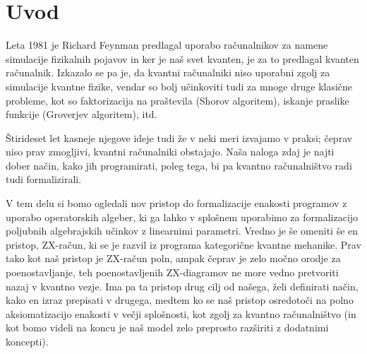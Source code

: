 \section{Uvod}

Leta 1981 je Richard Feynman predlagal uporabo računalnikov za namene simulacije fizikalnih pojavov\cite{feynman-1981}
in ker je naš svet kvanten, je za to predlagal kvanten računalnik.
Izkazalo se pa je, da kvantni računalniki niso uporabni zgolj za simulacije kvantne fizike,
vendar so bolj učinkoviti tudi za mnoge druge klasične probleme, kot so faktorizacija na praštevila (Shorov algoritem), iskanje praslike funkcije (Groverjev algoritem), itd.

Štirideset let kasneje njegove ideje tudi že v neki meri izvajamo v praksi;
čeprav niso prav zmogljivi, kvantni računalniki obstajajo.
Naša naloga zdaj je najti dober način, kako jih programirati,
poleg tega, bi pa kvantno računalništvo radi tudi formalizirali.

V tem delu si bomo ogledali nov pristop do formalizacije enakosti programov z uporabo operatorskih algeber, ki ga lahko v splošnem uporabimo za formalizacijo poljubnih algebrajskih učinkov z linearnimi parametri\cite{algeff-lin-qpl}.
Vredno je še omeniti še en pristop, ZX-račun\cite{zx-calculus,tdj}, ki se je razvil iz programa kategorične kvantne mehanike.
Prav tako kot naš pristop je ZX-račun poln, ampak čeprav je zelo močno orodje za poenostavljanje, teh poenostavljenih ZX-diagramov ne more vedno pretvoriti nazaj v kvantno vezje.
Ima pa ta pristop drug cilj od našega, želi definirati način, kako en izraz prepisati v drugega,
medtem ko se naš pristop osredotoči na polno aksiomatizacijo enakosti v večji splošnosti, kot zgolj za kvantno računalništvo (in kot bomo videli na koncu je naš model zelo preprosto razširiti z dodatnimi koncepti).
